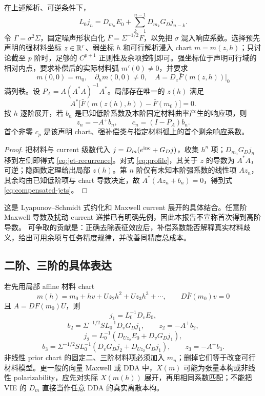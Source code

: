 \begin{theorem}
\label{thm:jets}
在上述解析、可逆条件下，
\begin{equation}
L_0j_n
=
D_{m_n}E_0+
\sum_{k=1}^{n-1}D_{m_k}G_Dj_{n-k}.
\label{eq:jet-recurrence}
\end{equation}
令 $\Gamma=\sigma^2\Sigma$，固定噪声形状白化 $\bar F=\Sigma^{-1/2}F$，以免把 $\sigma$ 混入响应系数。选择预先声明的强材料坐标 $z\in\mathbb R^r$、弱坐标 $h$ 和可行解析浸入 chart $m=m(z,h)$；只讨论截至 $p$ 阶时，足够的 $C^{p+1}$ 正则性及余项控制即可。强坐标位于声明可行域的相对内点，要求补偿后的实际材料弧 $m'(0)\ne0$，并要求
\[
m(0,0)=m_0,\quad \partial_hm(0,0)\ne0,\quad
A=D_z\bar F(m(z,h))|_{0}
\]
满列秩。设 $P_A=A(A^*A)^{-1}A^*$。局部存在唯一的 $z(h)$ 满足
\begin{equation}
A^*\big[\bar F(m(z(h),h))-\bar F(m_0)\big]=0.
\label{eq:profile}
\end{equation}
按 $h$ 逐阶展开，若 $b_n$ 是已知低阶系数及本阶固定材料曲率产生的响应项，则
\begin{equation}
z_n=-A^+b_n,\qquad c_n=(I-P_A)b_n.
\label{eq:compensated-jets}
\end{equation}
首个非零 $c_p$ 是该声明 chart、强补偿类与指定材料弧上的首个剩余响应系数。
\end{theorem}
\begin{proof}
把材料与 current 级数代入
$j=D_m(e^{\rm inc}+G_Dj)$，收集 $h^n$ 项；$D_{m_0}G_Dj_n$ 移到左侧即得式 \eqref{eq:jet-recurrence}。对式 \eqref{eq:profile}，其关于 $z$ 的导数为 $A^*A$，可逆；隐函数定理给出局部 $z(h)$。第 $n$ 阶仅有未知本阶强系数的线性项 $Az_n$，其余均由已知低阶项与 chart 导数决定，故 $A^*(Az_n+b_n)=0$，得到式 \eqref{eq:compensated-jets}。
\end{proof}

这是 Lyapunov--Schmidt 式约化和 Maxwell current 展开的具体结合。任意阶 Maxwell 导数及扰动 current 递推已有明确先例，因此本报告不宣称首次得到高阶导数。 可争取的贡献是：正确去除表征效应后，补偿系数能否解释真实材料歧义，给出可用余项与任务精度规律，并改善同精度总成本。

\subsection{二阶、三阶的具体表达}
若先用局部 affine 材料 chart
\[
m(h)=m_0+hv+Uz_2h^2+Uz_3h^3+\cdots,\qquad D\bar F(m_0)v=0
\]
且 $A=D\bar F(m_0)U$，则
\[
j_1=L_0^{-1}D_vE_0,
\]
\[
b_2=\Sigma^{-1/2}S L_0^{-1}D_vG_Dj_1,\qquad
z_2=-A^+b_2,
\]
\[
j_2=L_0^{-1}\!\left(D_{Uz_2}E_0+D_vG_Dj_1\right),
\]
\[
b_3=\Sigma^{-1/2}S L_0^{-1}
\left(D_vG_Dj_2+D_{Uz_2}G_Dj_1\right),\qquad
z_3=-A^+b_3.
\]
非线性 prior chart 的固定二、三阶材料项必须加入 $m_n$；删掉它们等于改变可行材料模型。更一般的向量 Maxwell 或 DDA 中，$X(m)$ 可能为张量本构或非线性 polarizability，应先对实际 $X(m(h))$ 展开，再用相同系数匹配；不能把 VIE 的 $D_m$ 直接当作任意 DDA 的真实离散本构。

